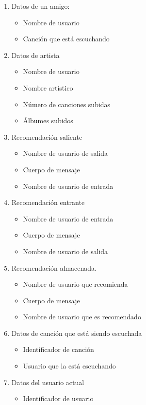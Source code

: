 \documentclass[12pt,a4paper]{article}
\begin{document}
\begin{enumerate}[label=\textnormal{RD\arabic*.}]
	\item Datos de un amigo:  \label{rd25}
		\begin{itemize}
			\item Nombre de usuario
			\item Canción que está escuchando
		\end{itemize}
	\item Datos de artista  \label{rd26}
		\begin{itemize}
			\item Nombre de usuario
			\item Nombre artístico
			\item Número de canciones subidas
			\item Álbumes subidos
		\end{itemize}
	\item Recomendación saliente  \label{rd27}
		\begin{itemize}
			\item Nombre de usuario de salida
			\item Cuerpo de mensaje
			\item Nombre de usuario de entrada
		\end{itemize}
	\item Recomendación entrante  \label{rd28}
		\begin{itemize}
			\item Nombre de usuario de entrada
			\item Cuerpo de mensaje
			\item Nombre de usuario de salida
		\end{itemize}
	\item Recomendación almacenada.  \label{rd29}
		\begin{itemize}
			\item Nombre de usuario que recomienda
			\item Cuerpo de mensaje
			\item Nombre de usuario que es recomendado
		\end{itemize}
	\item Datos de canción que está siendo escuchada  \label{rd30}
		\begin{itemize}
			\item Identificador de canción
			\item Usuario que la está escuchando
		\end{itemize}
	\item Datos del usuario actual  \label{rd31}
		\begin{itemize}
			\item Identificador de usuario

\end{itemize}
\end{enumerate}
\end{document}
